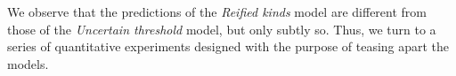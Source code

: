 \documentclass[floatsintext,man]{apa6}
\newcommand{\ndg}[1]{{\textcolor{Green}{[ndg: #1]}}}
\begin{document}
We observe that the predictions of the \emph{Reified kinds} model are different from those of the \emph{Uncertain threshold} model, but only subtly so.
Thus, we turn to a series of quantitative experiments designed with the purpose of teasing apart the models. 

%
%
%
\end{document}
